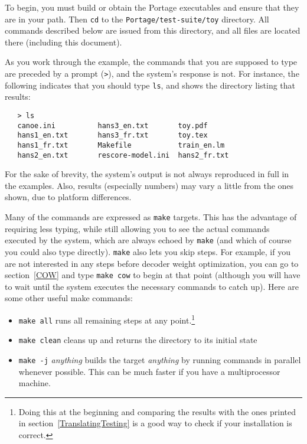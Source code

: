 \documentclass[11pt]{article}
\begin{document}
To begin, you must build or obtain the Portage executables and ensure that they
are in your path. Then {\tt cd} to the {\tt Portage/test-suite/toy} directory.
All commands described below are issued from this directory, and all files are
located there (including this document).

As you work through the example, the commands that you are supposed to type are
preceded by a prompt ({\tt >}), and the system's response is not. For instance,
the following indicates that you should type {\tt ls}, and shows the directory
listing that results:
\begin{verbatim}
   > ls
   canoe.ini          hans3_en.txt       toy.pdf
   hans1_en.txt       hans3_fr.txt       toy.tex
   hans1_fr.txt       Makefile           train_en.lm
   hans2_en.txt       rescore-model.ini  hans2_fr.txt       
\end{verbatim}
For the sake of brevity, the system's output is not always reproduced in full
in the examples. Also, results (especially numbers) may vary a little from the
ones shown, due to platform differences.

Many of the commands are expressed as {\tt make} targets. This has the
advantage of requiring less typing, while still allowing you to see the actual
commands executed by the system, which are always echoed by {\tt make} (and
which of course you could also type directly). {\tt make} also lets you skip
steps. For example, if you are not interested in any steps before decoder weight
optimization, you can go to section~\ref{COW} and type {\tt make cow} to begin
at that point (although you will have to wait until the system executes the
necessary commands to catch up). Here are some other useful make commands:
\begin{itemize}
\item {\tt make all} runs all remaining steps at any point.\footnote{Doing this
    at the beginning and comparing the results with the ones printed in
    section~\ref{TranslatingTesting} is a good way to check if your
    installation is correct.}
\item {\tt make clean} cleans up and returns the directory to its initial state

\item {\tt make -j} {\em anything} builds the target {\em anything} by running
      commands in parallel whenever possible. This can be much faster if you
      have a multiprocessor machine.
\end{itemize}
\end{document}
